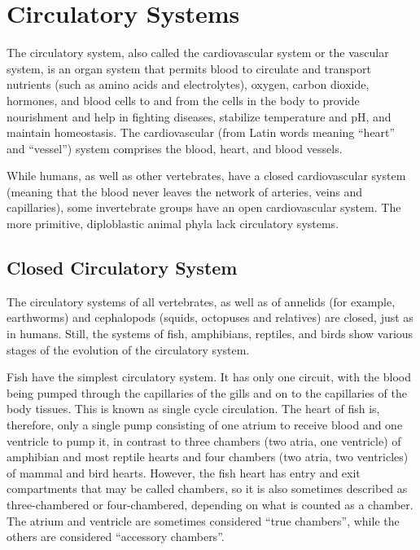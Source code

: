 \hypertarget{circulatory-systems}{%
\chapter{Circulatory Systems}\label{circulatory-systems}}

The circulatory system, also called the cardiovascular system or the vascular system, is an organ system that permits blood to circulate and transport nutrients (such as amino acids and electrolytes), oxygen, carbon dioxide, hormones, and blood cells to and from the cells in the body to provide nourishment and help in fighting diseases, stabilize temperature and pH, and maintain homeostasis. The cardiovascular (from Latin words meaning ``heart'' and ``vessel'') system comprises the blood, heart, and blood vessels.

While humans, as well as other vertebrates, have a closed cardiovascular system (meaning that the blood never leaves the network of arteries, veins and capillaries), some invertebrate groups have an open cardiovascular system. The more primitive, diploblastic animal phyla lack circulatory systems.

\hypertarget{closed-circulatory-system}{%
\section{Closed Circulatory System}\label{closed-circulatory-system}}

The circulatory systems of all vertebrates, as well as of annelids (for example, earthworms) and cephalopods (squids, octopuses and relatives) are closed, just as in humans. Still, the systems of fish, amphibians, reptiles, and birds show various stages of the evolution of the circulatory system.

Fish have the simplest circulatory system. It has only one circuit, with the blood being pumped through the capillaries of the gills and on to the capillaries of the body tissues. This is known as single cycle circulation. The heart of fish is, therefore, only a single pump consisting of one atrium to receive blood and one ventricle to pump it, in contrast to three chambers (two atria, one ventricle) of amphibian and most reptile hearts and four chambers (two atria, two ventricles) of mammal and bird hearts. However, the fish heart has entry and exit compartments that may be called chambers, so it is also sometimes described as three-chambered or four-chambered, depending on what is counted as a chamber. The atrium and ventricle are sometimes considered ``true chambers'', while the others are considered ``accessory chambers''.

